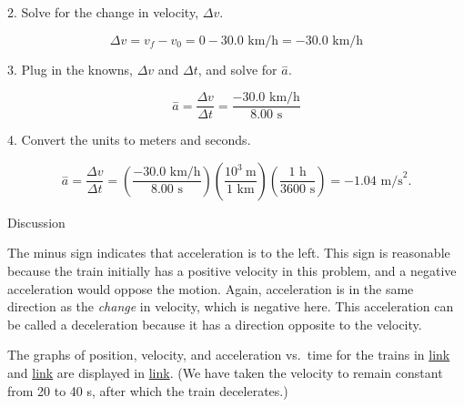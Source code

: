 \documentclass[
]{book}
\begin{document}
2. Solve for the change in velocity, \({\Delta v}{}\).

\leavevmode{}%
\[{{\Delta v = {v_{f} - v_{0}}} = 0 - \text{30}}\text{.}{\text{0\ km/h} = {- \text{30}}}\text{.0\ km/h}\]

3. Plug in the knowns, \({\Delta v}{}\) and \({\Delta t}{}\), and solve for
\(\overset{-}{a}{}\).

\leavevmode{}%
\[{{\overset{-}{a} = \frac{\Delta v}{\Delta t}} = \frac{{- \text{30}}\text{.}\text{0\ km/h}}{8\text{.}\text{00\ s}}}{}\]

4. Convert the units to meters and seconds.

\leavevmode{}%
\[{{{\overset{-}{a} = \frac{\Delta v}{\Delta t}} = \left( \frac{- \text{30.0\ km/h}}{\text{8.00\ s}} \right)}\left( \frac{\text{10}^{3}\ \text{m}}{\text{1\ km}} \right){\left( \frac{\text{1\ h}}{\text{3600\ s}} \right) = \text{−1.04\ m/s}^{2}}}\text{.}\]

{Discussion}

The minus sign indicates that acceleration is to the left. This sign is
reasonable because the train initially has a positive velocity in this
problem, and a negative acceleration would oppose the motion. Again,
acceleration is in the same direction as the \emph{change} in velocity, which
is negative here. This acceleration can be called a deceleration because
it has a direction opposite to the velocity.

The graphs of position, velocity, and acceleration vs.~time for the
trains in \protect\hyperlink{fs-id1372721}{link} and
\protect\hyperlink{fs-id3600466}{link} are displayed in
\protect\hyperlink{import-auto-id2596938}{link}. (We have taken
the velocity to remain constant from 20 to 40 s, after which the train
decelerates.)
\end{document}
